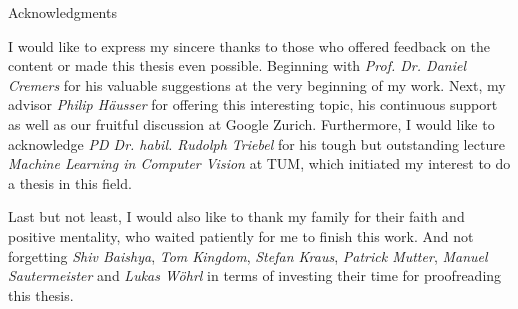 \thispagestyle{empty}

\vspace*{20mm}

\begin{center}
{ Acknowledgments}
\end{center}

\vspace{10mm}

I would like to express my sincere thanks to those who offered feedback on the content or made this thesis even possible. Beginning with \textit{Prof. Dr. Daniel Cremers} for his valuable suggestions at the very beginning of my work. Next, my advisor \textit{Philip Häusser} for offering this interesting topic, his continuous support as well as our fruitful discussion at Google Zurich. Furthermore, I would like to acknowledge \textit{PD Dr. habil. Rudolph Triebel} for his tough but outstanding lecture \textit{Machine Learning in Computer Vision} at TUM, which initiated my interest to do a thesis in this field.


Last but not least, I would also like to thank my family for their faith and positive mentality, who waited patiently for me to finish this work. And not forgetting \textit{Shiv Baishya}, \textit{Tom Kingdom}, \textit{Stefan Kraus}, \textit{Patrick Mutter}, \textit{Manuel Sautermeister} and \textit{Lukas Wöhrl} in terms of investing their time for proofreading this thesis.

\cleardoublepage{}
